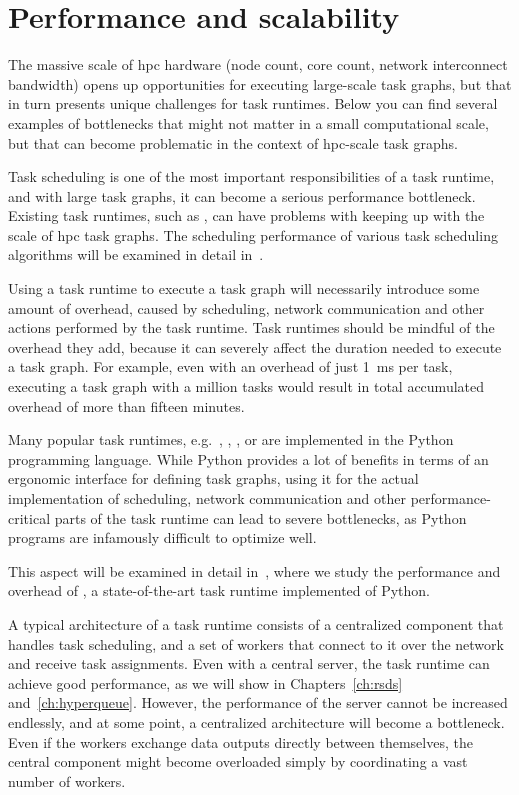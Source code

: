 \section{Performance and scalability}
The massive scale of \gls{hpc} hardware (node count, core count, network interconnect
bandwidth) opens up opportunities for executing large-scale task graphs, but that in turn presents
unique challenges for task runtimes. Below you can find several examples of bottlenecks that might
not matter in a small computational scale, but that can become problematic in the context of
\gls{hpc}-scale task graphs.

\begin{description}[wide=0pt]
	\item[Scheduling] Task scheduling is one of the most important responsibilities of a task runtime, and with large
		task graphs, it can become a serious performance bottleneck. Existing task runtimes, such as
		\dask{}, can have problems with keeping up with the scale of \gls{hpc}
		task graphs. The scheduling performance of various task scheduling algorithms will be examined in
		detail in~.
	\item[Runtime overhead] Using a task runtime to execute a task graph will necessarily introduce some amount of overhead,
		caused by scheduling, network communication and other actions performed by the task runtime. Task
		runtimes should be mindful of the overhead they add, because it can severely affect the duration
		needed to execute a task graph. For example, even with an overhead of just \SI{1}{\milli\second}
		per task, executing a task graph with a million tasks would result in total accumulated overhead of
		more than fifteen minutes.

		Many popular task runtimes, e.g.\ \dask{}, \parsl{},
		\balsam{}, \autosubmit{} or \snakemake{} are implemented in the
		Python programming language. While Python provides a lot of benefits in terms of an ergonomic
		interface for defining task graphs, using it for the actual implementation of scheduling, network
		communication and other performance-critical parts of the task runtime can lead to severe
		bottlenecks, as Python programs are infamously difficult to optimize well.

		This aspect will be examined in detail in~, where we study the performance
		and overhead of \dask{}, a state-of-the-art task runtime implemented of Python.

	\item[Architecture] A typical architecture of a task runtime consists of a centralized component that handles task
		scheduling, and a set of workers that connect to it over the network and receive task assignments.
		Even with a central server, the task runtime can achieve good performance, as we will show in
		Chapters~\ref{ch:rsds} and~\ref{ch:hyperqueue}. However, the performance of the server
		cannot be increased endlessly, and at some point, a centralized architecture will become a
		bottleneck. Even if the workers exchange data outputs directly between themselves, the central
		component might become overloaded simply by coordinating a vast number of workers.


\end{description}
